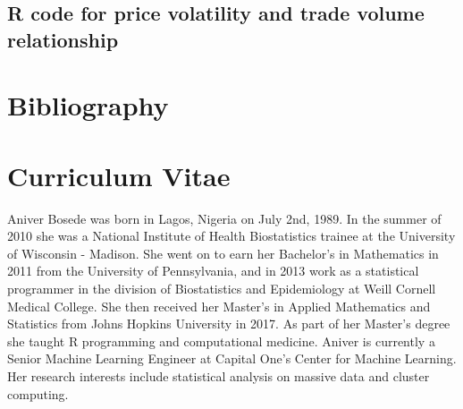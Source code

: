 \documentclass[12pt]{article}
\begin{document}
	\subsection{R code for price volatility and trade volume relationship} 
		\label{app:Code5}
		
		\newpage

\section*{Bibliography}
\renewcommand{\bibsection}{}


\newpage

\doublespacing
\section*{Curriculum Vitae}
Aniver Bosede was born in Lagos, Nigeria on July 2nd, 1989. In the summer of 2010 she was a National Institute of Health Biostatistics trainee at the University of Wisconsin - Madison. She went on to earn her Bachelor's in Mathematics in 2011 from the University of Pennsylvania, and in 2013 work as a statistical programmer in the division of Biostatistics and Epidemiology at Weill Cornell Medical College. She then received her Master's in Applied Mathematics and Statistics from Johns Hopkins University in 2017. As part of her Master's degree she taught R programming and computational medicine. Aniver is currently a Senior Machine Learning Engineer at Capital One's Center for Machine Learning. Her research interests include statistical analysis on massive data and cluster computing.
\end{document}
